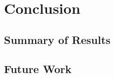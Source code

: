 \chapter{Conclusion}

\section{Summary of Results}\label{sec:result-summary}
\section{Future Work}\label{sec:future-work}

\endinput